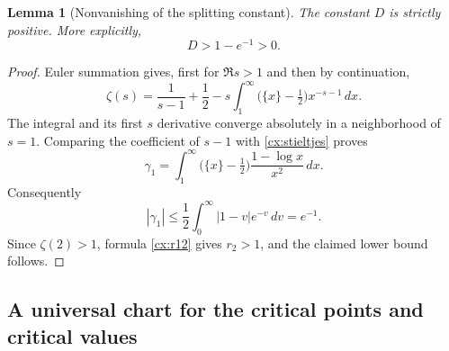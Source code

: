 \documentclass[11pt,a4paper]{article}
\numberwithin{equation}{section}
\newtheorem{lemma}[theorem]{Lemma}
\theoremstyle{definition}
\theoremstyle{remark}
\begin{document}
\begin{lemma}[Nonvanishing of the splitting constant]\label{cx:D-positive}
The constant $D$ is strictly positive.  More explicitly,
\[
 D>1-e^{-1}>0.
\]
\end{lemma}
\begin{proof}
Euler summation gives, first for $\Re s>1$ and then by continuation,
\[
 \zeta(s)=\frac1{s-1}+\frac12
        -s\int_1^\infty\bigl(\{x\}-\tfrac12\bigr)x^{-s-1}\,dx.
\]
The integral and its first $s$ derivative converge absolutely in a
neighborhood of $s=1$.  Comparing the coefficient of $s-1$ with
\eqref{cx:stieltjes} proves
\[
 \gamma_1=\int_1^\infty
    \bigl(\{x\}-\tfrac12\bigr)\frac{1-\log x}{x^2}\,dx.
\]
Consequently
\[
 |\gamma_1|\le\frac12\int_0^\infty |1-v|e^{-v}\,dv=e^{-1}.
\]
Since $\zeta(2)>1$, formula \eqref{cx:r12} gives $r_2>1$, and the
claimed lower bound follows.
\end{proof}

\subsection{A universal chart for the critical points and critical values}
\end{document}
